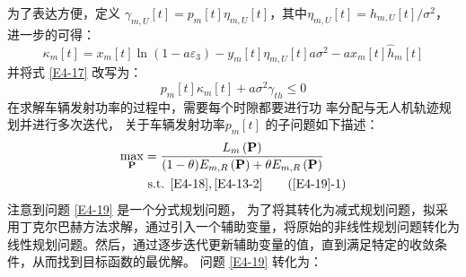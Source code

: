 为了表达方便，定义  %
$\gamma_{m,U}\left[t\right]=p_m\left[t\right]\eta_{m,U}\left[t\right]$，其中$\eta_{m,U}\left[t\right]=h_{m,U}\left[t\right]/{\sigma^2}$，进一步的可得：
\begin{equation} \label{E4-1833}
{{\kappa }_{m}}\left[ t \right]={{x}_{m}}\left[ t \right]\ln \left( 1-a{{\varepsilon }_{3}} \right)-{{y}_{m}}\left[ t \right]{{\eta }_{m,U}}\left[ t \right]a{{\sigma }^{2}}-a{{x}_{m}}\left[ t \right]{{\hat{h}}\phantom{}_{m}}\left[ t \right]
\end{equation}
并将式 \eqref{E4-17} 改写为：%
\begin{equation} \label{E4-18}
{{p}_{m}}\left[ t \right]{{\kappa }_{m}}\left[ t \right]+a{{\sigma }^{2}}{{\gamma }_{th}}\le 0
\end{equation}
在求解车辆发射功率的过程中，需要每个时隙都要进行功
率分配与无人机轨迹规划并进行多次迭代，
关于车辆发射功率$p_m\left[t\right]$ 的子问题如下描述：
\begin{align}  \label{E4-19}
\max _{ \mathbf{P}} &   ={\frac{{{L}_{m}}\left( \mathbf{P} \right)}
{(1-\theta){E}_{m,R}\left( \mathbf{P} \right)+\theta{E}_{m,R}\left( \mathbf{P} \right)}}        \\
&\text { s.t. }
 \eqref{E4-18},\eqref{E4-13-2}                                                  \tag{\ref{E4-19}{-1}}      \label{E4-19-1}
\end{align}
注意到问题 \eqref{E4-19} 是一个分式规划问题，
为了将其转化为减式规划问题，拟采用丁克尔巴赫方法求解，通过引入一个辅助变量，将原始的非线性规划问题转化为线性规划问题。然后，通过逐步迭代更新辅助变量的值，直到满足特定的收敛条件，从而找到目标函数的最优解。
问题 \eqref{E4-19} 转化为：
